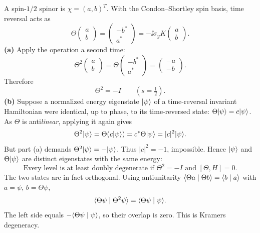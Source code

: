 A spin-$1/2$ spinor is
$\chi=(a,b)^T$. With the
Condon--Shortley spin basis,
time reversal acts as
\begin{equation}
\boxed{\Theta\begin{pmatrix}a\\b\end{pmatrix}
=\begin{pmatrix}-b^*\\a^*\end{pmatrix}
=-\ii\sigma_yK\begin{pmatrix}a\\b\end{pmatrix}.}
\end{equation}
\textbf{(a)} Apply the operation a second time:
\[
\Theta^2\begin{pmatrix}a\\b\end{pmatrix}
=\Theta\begin{pmatrix}-b^*\\a^*\end{pmatrix}
=\begin{pmatrix}-a\\-b\end{pmatrix}.
\]
Therefore
\begin{equation}
\boxed{\Theta^2=-I\qquad(s=\tfrac12).}
\end{equation}
\textbf{(b)} Suppose a normalized energy
eigenstate $\lvert \psi\rangle$ of a
time-reversal invariant Hamiltonian
were identical, up to phase,
to its time-reversed state:
$\Theta\lvert \psi\rangle=c\lvert \psi\rangle$.
As $\Theta$ is anti\emph{linear},
applying it again gives
\[
\Theta^2\lvert \psi\rangle
=\Theta(c\lvert \psi\rangle)
=c^*\Theta\lvert \psi\rangle
=|c|^2\lvert \psi\rangle.
\]
But part (a) demands
$\Theta^2\lvert \psi\rangle=-\lvert \psi\rangle$.
Thus $|c|^2=-1$, impossible.
Hence $\lvert \psi\rangle$ and
$\Theta\lvert \psi\rangle$ are distinct
eigenstates with the same energy:
\begin{equation}
\boxed{\text{Every level is at least doubly
degenerate if }\Theta^2=-I
\text{ and }[\Theta,H]=0.}
\end{equation}
The two states are in fact orthogonal.
Using antiunitarity
$\langle \Theta a\mid \Theta b\rangle=
\langle b\mid a\rangle$ with $a=\psi$, $b=\Theta\psi$,
\[
\langle \Theta\psi\mid \Theta^2\psi\rangle
=\langle \Theta\psi\mid \psi\rangle.
\]
The left side equals
$-\langle \Theta\psi\mid \psi\rangle$,
so their overlap is zero.
This is Kramers degeneracy.
